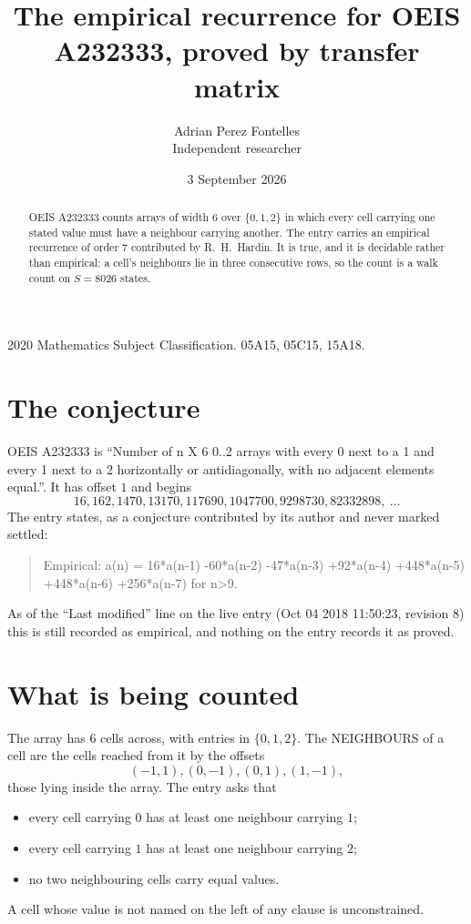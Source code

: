 \documentclass[11pt,a4paper]{article}
\title{The empirical recurrence for OEIS A232333, proved by transfer matrix}
\author{Adrian Perez Fontelles\\ \small Independent researcher}
\date{3 September 2026}
\theoremstyle{plain}
\theoremstyle{definition}
\begin{document}
\maketitle

\begin{abstract}
OEIS A232333 counts arrays of width $6$ over $\{0,1,2\}$ in which every cell carrying one stated
value must have a neighbour carrying another. The entry carries an empirical recurrence of
order $7$ contributed by R.~H.~Hardin. It is true, and it is decidable rather than
empirical: a cell's neighbours lie in three consecutive rows, so the count is a walk count on
$S=8026$ states.
\end{abstract}

\noindent\small 2020 Mathematics Subject Classification. 05A15, 05C15, 15A18.\normalsize

\section{The conjecture}

OEIS A232333 is ``Number of n X 6 0..2 arrays with every 0 next to a 1 and every 1 next to a 2 horizontally or antidiagonally, with no adjacent elements equal.''. It has offset $1$ and begins
\[
16, 162, 1470, 13170, 117690, 1047700, 9298730, 82332898,\ \dots
\]
The entry states, as a conjecture contributed by its author and never marked settled:
\begin{quote}
Empirical: a(n) = 16*a(n-1) -60*a(n-2) -47*a(n-3) +92*a(n-4) +448*a(n-5) +448*a(n-6) +256*a(n-7) for n>9.
\end{quote}
As of the ``Last modified'' line on the live entry (Oct 04 2018 11:50:23, revision 8) this is still
recorded as empirical, and nothing on the entry records it as proved.

\section{What is being counted}

The array has $6$ cells across, with entries in $\{0,1,2\}$. The NEIGHBOURS of a cell are the
cells reached from it by the offsets
\[
(-1,1), (0,-1), (0,1), (1,-1),
\]
those lying inside the array. The entry asks that
\begin{itemize}
\item every cell carrying $0$ has at least one neighbour carrying $1$;
\item every cell carrying $1$ has at least one neighbour carrying $2$;
\item no two neighbouring cells carry equal values.
\end{itemize}
A cell whose value is not named on the left of any clause is unconstrained.
\end{document}
